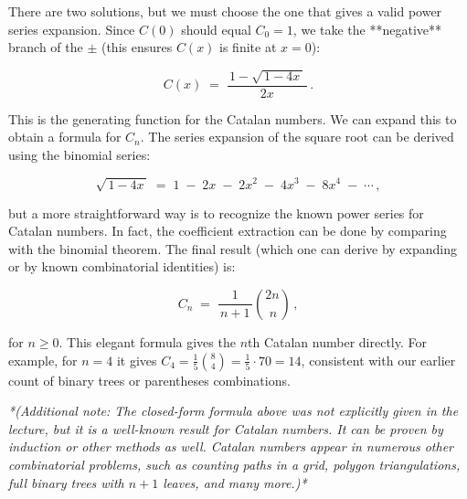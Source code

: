 \documentclass{article}
\begin{document}
There are two solutions, but we must choose the one that gives a valid power series expansion. Since $C(0)$ should equal $C_0 = 1$, we take the **negative** branch of the $\pm$ (this ensures $C(x)$ is finite at $x=0$):

\[
C(x) \;=\; \frac{\,1 - \sqrt{\,1 - 4x\,}\,}{2x}\,.
\]

This is the generating function for the Catalan numbers. We can expand this to obtain a formula for $C_n$. The series expansion of the square root can be derived using the binomial series:

\[
\sqrt{\,1 - 4x\,} \;=\; 1 \;-\; 2x \;-\; 2x^2 \;-\; 4x^3 \;-\; 8x^4 \;-\; \cdots\,,
\] 

but a more straightforward way is to recognize the known power series for Catalan numbers. In fact, the coefficient extraction can be done by comparing with the binomial theorem. The final result (which one can derive by expanding or by known combinatorial identities) is:

\[
C_n \;=\; \frac{1}{\,n+1\,}\binom{2n}{\,n}\,,
\] 

for $n \ge 0$. This elegant formula gives the $n$th Catalan number directly. For example, for $n=4$ it gives $C_4 = \frac{1}{5}\binom{8}{4} = \frac{1}{5}\cdot 70 = 14$, consistent with our earlier count of binary trees or parentheses combinations.

\textit{*(Additional note: The closed-form formula above was not explicitly given in the lecture, but it is a well-known result for Catalan numbers. It can be proven by induction or other methods as well. Catalan numbers appear in numerous other combinatorial problems, such as counting paths in a grid, polygon triangulations, full binary trees with $n+1$ leaves, and many more.)*}
\end{document}

